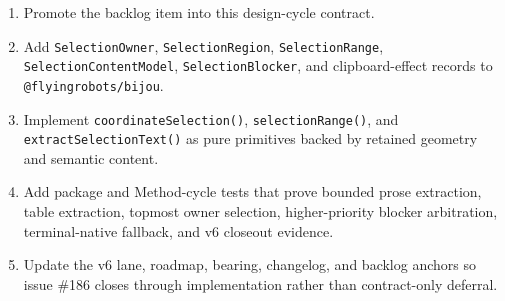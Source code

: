 \begin{enumerate}
\def\labelenumi{\arabic{enumi}.}
\tightlist
\item
  Promote the backlog item into this design-cycle contract.
\item
  Add \texttt{S\allowbreak{}e\allowbreak{}l\allowbreak{}e\allowbreak{}c\allowbreak{}t\allowbreak{}i\allowbreak{}o\allowbreak{}n\allowbreak{}O\allowbreak{}w\allowbreak{}n\allowbreak{}e\allowbreak{}r}, \texttt{S\allowbreak{}e\allowbreak{}l\allowbreak{}e\allowbreak{}c\allowbreak{}t\allowbreak{}i\allowbreak{}o\allowbreak{}n\allowbreak{}R\allowbreak{}e\allowbreak{}g\allowbreak{}i\allowbreak{}o\allowbreak{}n}, \texttt{S\allowbreak{}e\allowbreak{}l\allowbreak{}e\allowbreak{}c\allowbreak{}t\allowbreak{}i\allowbreak{}o\allowbreak{}n\allowbreak{}R\allowbreak{}a\allowbreak{}n\allowbreak{}g\allowbreak{}e}, \texttt{S\allowbreak{}e\allowbreak{}l\allowbreak{}e\allowbreak{}c\allowbreak{}t\allowbreak{}i\allowbreak{}o\allowbreak{}n\allowbreak{}C\allowbreak{}o\allowbreak{}n\allowbreak{}t\allowbreak{}e\allowbreak{}n\allowbreak{}t\allowbreak{}M\allowbreak{}o\allowbreak{}d\allowbreak{}e\allowbreak{}l}, \texttt{S\allowbreak{}e\allowbreak{}l\allowbreak{}e\allowbreak{}c\allowbreak{}t\allowbreak{}i\allowbreak{}o\allowbreak{}n\allowbreak{}B\allowbreak{}l\allowbreak{}o\allowbreak{}c\allowbreak{}k\allowbreak{}e\allowbreak{}r}, and clipboard-effect records to \texttt{@\allowbreak{}f\allowbreak{}l\allowbreak{}y\allowbreak{}i\allowbreak{}n\allowbreak{}g\allowbreak{}r\allowbreak{}o\allowbreak{}b\allowbreak{}o\allowbreak{}t\allowbreak{}s\allowbreak{}/\allowbreak{}b\allowbreak{}i\allowbreak{}j\allowbreak{}o\allowbreak{}u}.
\item
  Implement \texttt{c\allowbreak{}o\allowbreak{}o\allowbreak{}r\allowbreak{}d\allowbreak{}i\allowbreak{}n\allowbreak{}a\allowbreak{}t\allowbreak{}e\allowbreak{}S\allowbreak{}e\allowbreak{}l\allowbreak{}e\allowbreak{}c\allowbreak{}t\allowbreak{}i\allowbreak{}o\allowbreak{}n\allowbreak{}(\allowbreak{})}, \texttt{s\allowbreak{}e\allowbreak{}l\allowbreak{}e\allowbreak{}c\allowbreak{}t\allowbreak{}i\allowbreak{}o\allowbreak{}n\allowbreak{}R\allowbreak{}a\allowbreak{}n\allowbreak{}g\allowbreak{}e\allowbreak{}(\allowbreak{})}, and \texttt{e\allowbreak{}x\allowbreak{}t\allowbreak{}r\allowbreak{}a\allowbreak{}c\allowbreak{}t\allowbreak{}S\allowbreak{}e\allowbreak{}l\allowbreak{}e\allowbreak{}c\allowbreak{}t\allowbreak{}i\allowbreak{}o\allowbreak{}n\allowbreak{}T\allowbreak{}e\allowbreak{}x\allowbreak{}t\allowbreak{}(\allowbreak{})} as pure primitives backed by retained geometry and semantic content.
\item
  Add package and Method-cycle tests that prove bounded prose extraction, table extraction, topmost owner selection, higher-priority blocker arbitration, terminal-native fallback, and v6 closeout evidence.
\item
  Update the v6 lane, roadmap, bearing, changelog, and backlog anchors so issue \#186 closes through implementation rather than contract-only deferral.
\end{enumerate}

